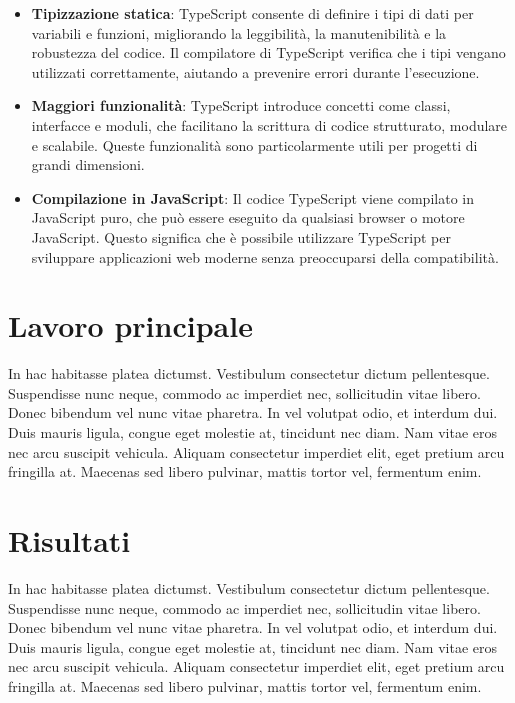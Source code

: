 \documentclass[target=bach,aauheader=,style=]{thud}
\begin{document}
\begin{itemize}
  \item \textbf{Tipizzazione statica}: TypeScript consente di definire i tipi di dati per variabili e funzioni, migliorando la leggibilità, la manutenibilità e la robustezza del codice. Il compilatore di TypeScript verifica che i tipi vengano utilizzati correttamente, aiutando a prevenire errori durante l'esecuzione.
  \item \textbf{Maggiori funzionalità}: TypeScript introduce concetti come classi, interfacce e moduli, che facilitano la scrittura di codice strutturato, modulare e scalabile. Queste funzionalità sono particolarmente utili per progetti di grandi dimensioni.
  \item \textbf{Compilazione in JavaScript}: Il codice TypeScript viene compilato in JavaScript puro, che può essere eseguito da qualsiasi browser o motore JavaScript. Questo significa che è possibile utilizzare TypeScript per sviluppare applicazioni web moderne senza preoccuparsi della compatibilità.
\end{itemize}


\chapter{Lavoro principale}
In hac habitasse platea dictumst. Vestibulum consectetur dictum pellentesque. Suspendisse nunc neque, commodo ac imperdiet nec, sollicitudin vitae libero. Donec bibendum vel nunc vitae pharetra. In vel volutpat odio, et interdum dui. Duis mauris ligula, congue eget molestie at, tincidunt nec diam. Nam vitae eros nec arcu suscipit vehicula. Aliquam consectetur imperdiet elit, eget pretium arcu fringilla at. Maecenas \cite{Knu86} sed libero pulvinar, mattis tortor vel, fermentum enim.


\chapter{Risultati}
In hac habitasse platea dictumst. Vestibulum consectetur dictum pellentesque. Suspendisse nunc neque, commodo ac imperdiet nec, sollicitudin vitae libero. Donec bibendum vel nunc vitae pharetra. In vel volutpat odio, et interdum dui. Duis mauris ligula, congue eget molestie at, tincidunt nec diam. Nam vitae eros nec arcu suscipit vehicula. Aliquam consectetur imperdiet elit, eget pretium arcu fringilla at. Maecenas \cite{Knu86} sed libero pulvinar, mattis tortor vel, fermentum enim.
\end{document}
